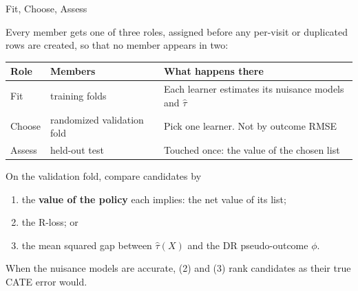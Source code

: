 \documentclass[aspectratio=169, 11pt, handout]{beamer}
\newcommand{\hatt}{\hat{\tau}}
\begin{document}
\begin{frame}{Fit, Choose, Assess}

Every member gets one of three roles, assigned before any per-visit or duplicated rows are created, so that no member appears in two:

\begin{center}
\small
\begin{tabular}{llp{7.0cm}}
\toprule
\textbf{Role} & \textbf{Members} & \textbf{What happens there} \\
\midrule
Fit & training folds & Each learner estimates its nuisance models and $\hatt$ \\
Choose & randomized validation fold & Pick one learner. \textcolor{warnred}{Not by outcome RMSE} \\
Assess & held-out test & Touched once: the value of the chosen list \\
\bottomrule
\end{tabular}
\end{center}

\medskip

On the validation fold, compare candidates by
\begin{enumerate}
  \item the \textbf{value of the policy} each implies: the net value of its list;
  \item the R-loss; or
  \item the mean squared gap between $\hatt(X)$ and the DR pseudo-outcome $\phi$.
\end{enumerate}

When the nuisance models are accurate, (2) and (3) rank candidates as their true CATE error would.
\end{frame}
\end{document}
